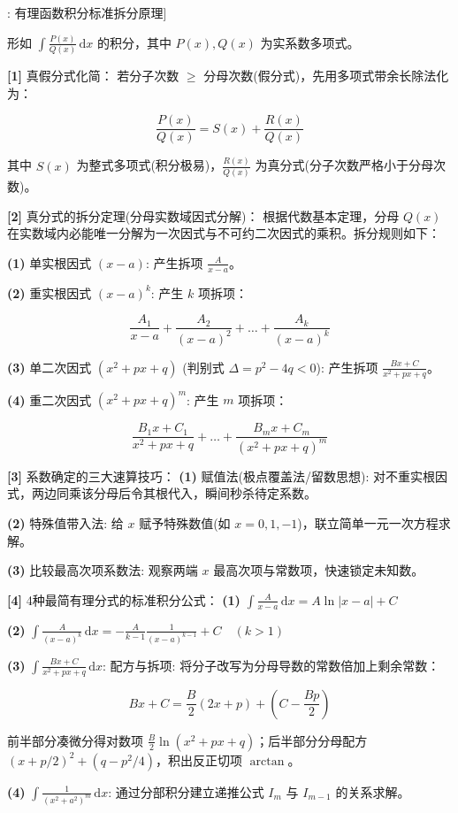 \documentclass[11pt,a4paper,UTF8]{ctexart}
\begin{document}
\begin{thmbox}[方法[1]: 有理函数积分标准拆分原理]

形如 $\int \frac{P(x)}{Q(x)}\,\mathrm{d}x$ 的积分，其中 $P(x), Q(x)$ 为实系数多项式。

\textbf{[1]} 真假分式化简：
若分子次数 $\geqslant$ 分母次数(假分式)，先用多项式带余长除法化为：


\begin{equation*}
\frac{P(x)}{Q(x)} = S(x) + \frac{R(x)}{Q(x)}
\end{equation*}


其中 $S(x)$ 为整式多项式(积分极易)，$\frac{R(x)}{Q(x)}$ 为真分式(分子次数严格小于分母次数)。

\textbf{[2]} 真分式的拆分定理(分母实数域因式分解)：
根据代数基本定理，分母 $Q(x)$ 在实数域内必能唯一分解为一次因式与不可约二次因式的乘积。拆分规则如下：

\textbf{(1)}  单实根因式 $(x-a)$:
产生拆项 $\frac{A}{x-a}$。

\textbf{(2)}  重实根因式 $(x-a)^k$:
产生 $k$ 项拆项：


\begin{equation*}
\frac{A_1}{x-a} + \frac{A_2}{(x-a)^2} + \dots + \frac{A_k}{(x-a)^k}
\end{equation*}


\textbf{(3)}  单二次因式 $(x^2+px+q)$ (判别式 $\Delta = p^2 - 4q < 0$):
产生拆项 $\frac{Bx+C}{x^2+px+q}$。

\textbf{(4)}  重二次因式 $(x^2+px+q)^m$:
产生 $m$ 项拆项：


\begin{equation*}
\frac{B_1 x + C_1}{x^2+px+q} + \dots + \frac{B_m x + C_m}{(x^2+px+q)^m}
\end{equation*}


\textbf{[3]} 系数确定的三大速算技巧：
\textbf{(1)}  赋值法(极点覆盖法/留数思想): 对不重实根因式，两边同乘该分母后令其根代入，瞬间秒杀待定系数。

\textbf{(2)}  特殊值带入法: 给 $x$ 赋予特殊数值(如 $x=0, 1, -1$)，联立简单一元一次方程求解。

\textbf{(3)}  比较最高次项系数法: 观察两端 $x$ 最高次项与常数项，快速锁定未知数。

\textbf{[4]} 4种最简有理分式的标准积分公式：
\textbf{(1)}  $\int \frac{A}{x-a}\,\mathrm{d}x = A\ln|x-a| + C$

\textbf{(2)}  $\int \frac{A}{(x-a)^k}\,\mathrm{d}x = -\frac{A}{k-1}\frac{1}{(x-a)^{k-1}} + C \quad (k > 1)$

\textbf{(3)}  $\int \frac{Bx+C}{x^2+px+q}\,\mathrm{d}x$:
配方与拆项: 将分子改写为分母导数的常数倍加上剩余常数：


\begin{equation*}
Bx + C = \frac{B}{2}(2x + p) + \left(C - \frac{Bp}{2}\right)
\end{equation*}


前半部分凑微分得对数项 $\frac{B}{2}\ln(x^2+px+q)$；后半部分分母配方 $(x + p/2)^2 + (q - p^2/4)$，积出反正切项 $\arctan$。

\textbf{(4)}  $\int \frac{1}{(x^2+a^2)^m}\,\mathrm{d}x$:
通过分部积分建立递推公式 $I_m$ 与 $I_{m-1}$ 的关系求解。

\end{thmbox}
\end{document}
